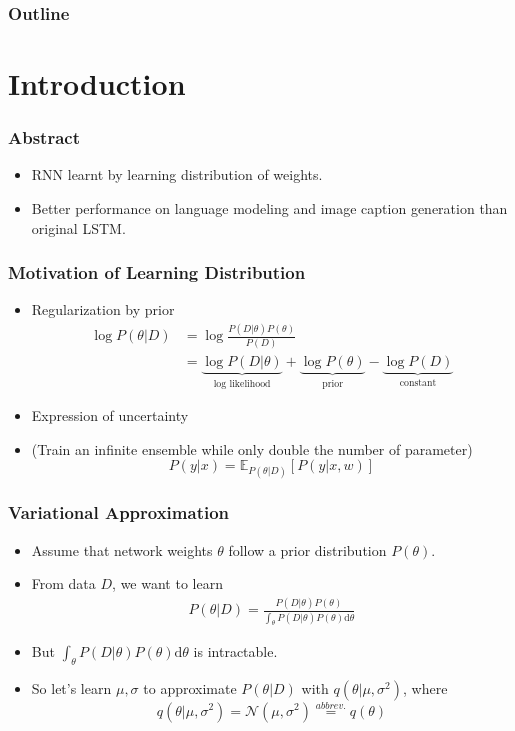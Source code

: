 
\begin{frame}
\frametitle{Outline}
\tableofcontents
\end{frame}
\section{Introduction}


\begin{frame}
  \frametitle{Abstract}
  \begin{itemize}
  \item RNN learnt by learning distribution of weights.
  \item Better performance on language modeling and image caption generation than original LSTM.
  \end{itemize}
\end{frame}


\begin{frame}
  \frametitle{Motivation of Learning Distribution}
  \begin{itemize}
  \item Regularization by prior
    \begin{align*}
      \log P(\theta | D)
      &= \log \frac{P(D | \theta) P(\theta)}{P(D)} \\
      &= \underbrace{\log P(D | \theta)}_{\text{log likelihood}}
        + \underbrace{\log P(\theta)}_{\text{prior}}
        - \underbrace{\log P(D)}_{\text{constant}}
    \end{align*}
    
  \item Expression of uncertainty
  \item (Train an infinite ensemble while only double the number of parameter)
    \begin{equation*}
      P(y | x) = \mathbb{E}_{P(\theta|D)}[P(y|x, w)]
    \end{equation*}
  \end{itemize}
\end{frame}


\begin{frame}
  \frametitle{Variational Approximation}
  \begin{itemize}
  \item Assume that network weights $\theta$ follow a prior distribution $P(\theta)$.
  \item From data $D$, we want to learn 
    \begin{align*}
      P(\theta | D) = \frac{P(D | \theta) P(\theta)}{\int_\theta P(D | \theta) P(\theta) \mathrm{d}\theta }
    \end{align*}
  \item But $\int_\theta P(D | \theta) P(\theta) \mathrm{d}\theta$ is intractable.
  \item So let's learn $\mu, \sigma$ to approximate $P(\theta | D)$ with $q(\theta | \mu, \sigma^2)$, where
    \begin{equation*}
      q(\theta | \mu, \sigma^2) = \mathcal{N}(\mu, \sigma^2) \stackrel{abbrev.}{=} q(\theta)
    \end{equation*}
  \end{itemize}
\end{frame}


